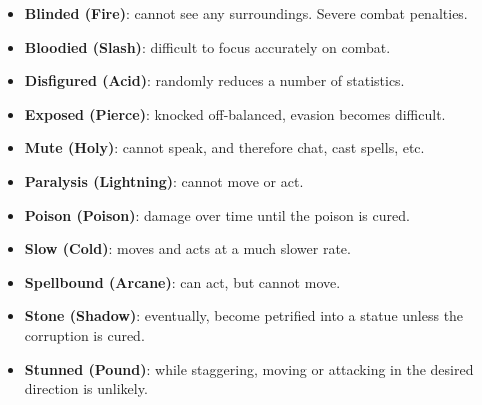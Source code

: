 \begin{itemize}
\item {\bf Blinded (Fire)}: cannot see any surroundings.  Severe combat 
penalties.
\item {\bf Bloodied (Slash)}: difficult to focus accurately on combat.  
\item {\bf Disfigured (Acid)}: randomly reduces a number of statistics.
\item {\bf Exposed (Pierce)}: knocked off-balanced, evasion becomes 
difficult.  
\item {\bf Mute (Holy)}: cannot speak, and therefore chat, cast spells, 
etc.
\item {\bf Paralysis (Lightning)}: cannot move or act.
\item {\bf Poison (Poison)}: damage over time until the poison is cured.
\item {\bf Slow (Cold)}: moves and acts at a much slower rate.
\item {\bf Spellbound (Arcane)}: can act, but cannot move.
\item {\bf Stone (Shadow)}: eventually, become petrified into a statue 
unless the corruption is cured.
\item {\bf Stunned (Pound)}: while staggering, moving or attacking in the 
desired direction is unlikely.
\end{itemize}

